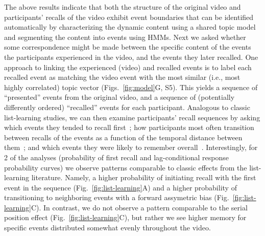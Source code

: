 \documentclass{article}
\newcommand{\matchmats}{S5}
\begin{document}
The above results indicate that both the structure of the original video and participants' recalls of the video exhibit event boundaries that can be identified automatically by characterizing the dynamic content using a shared topic model and segmenting the content into events using HMMs.  Next we asked whether some correspondence might be made between the specific content of the events the participants experienced in the video, and the events they later recalled.  One approach to linking the experienced (video) and recalled events is to label each recalled event as matching the video event with the most similar (i.e., most highly correlated) topic vector (Figs.~\ref{fig:model}G, \matchmats).  This yields a sequence of ``presented'' events from the original video, and a sequence of (potentially differently ordered) ``recalled'' events for each participant.  Analogous to classic list-learning studies, we can then examine participants' recall sequences by asking which events they tended to recall first~\citep[probability of first recall; Fig.~\ref{fig:list-learning}A;][]{WelcBurn24, PostPhil65, AtkiShif68}; how participants most often transition between recalls of the events as a function of the temporal distance between them~\citep[lag-conditional response probability; Fig.~\ref{fig:list-learning}B;][]{Kaha96}; and which events they were likely to remember overall~\citep[serial position recall analyses; Fig.~\ref{fig:list-learning}C;][]{Murd62a}. Interestingly, for 2 of the analyses (probability of first recall and lag-conditional response probability curves) we observe patterns comparable to classic effects from the list-learning literature. Namely, a higher probability of initiating recall with the first event in the sequence (Fig.~\ref{fig:list-learning}A) and a higher probability of transitioning to neighboring events with a forward assymetric bias (Fig.~\ref{fig:list-learning}C). In contrast, we do not observe a pattern comparable to the serial position effect (Fig.~\ref{fig:list-learning}C), but rather we see higher memory for specific events distributed somewhat evenly throughout the video.

\end{document}

